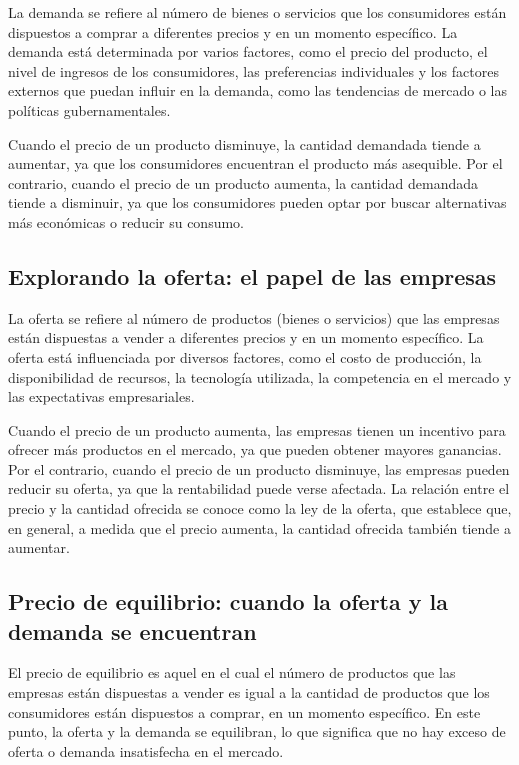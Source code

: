 \documentclass[
  man,
  floatsintext,
  longtable,
  a4paper,
  nolmodern,
  notxfonts,
  notimes,
  12pt,
  colorlinks=true,linkcolor=blue,citecolor=blue,urlcolor=blue]{apa7}
\begin{document}
La demanda se refiere al número de bienes o servicios que los
consumidores están dispuestos a comprar a diferentes precios y en un
momento específico. La demanda está determinada por varios factores,
como el precio del producto, el nivel de ingresos de los consumidores,
las preferencias individuales y los factores externos que puedan influir
en la demanda, como las tendencias de mercado o las políticas
gubernamentales.

Cuando el precio de un producto disminuye, la cantidad demandada tiende
a aumentar, ya que los consumidores encuentran el producto más
asequible. Por el contrario, cuando el precio de un producto aumenta, la
cantidad demandada tiende a disminuir, ya que los consumidores pueden
optar por buscar alternativas más económicas o reducir su consumo.

\subsection{Explorando la oferta: el papel de las
empresas}\label{explorando-la-oferta-el-papel-de-las-empresas}

La oferta se refiere al número de productos (bienes o servicios) que las
empresas están dispuestas a vender a diferentes precios y en un momento
específico. La oferta está influenciada por diversos factores, como el
costo de producción, la disponibilidad de recursos, la tecnología
utilizada, la competencia en el mercado y las expectativas
empresariales.

Cuando el precio de un producto aumenta, las empresas tienen un
incentivo para ofrecer más productos en el mercado, ya que pueden
obtener mayores ganancias. Por el contrario, cuando el precio de un
producto disminuye, las empresas pueden reducir su oferta, ya que la
rentabilidad puede verse afectada. La relación entre el precio y la
cantidad ofrecida se conoce como la ley de la oferta, que establece que,
en general, a medida que el precio aumenta, la cantidad ofrecida también
tiende a aumentar.

\subsection{Precio de equilibrio: cuando la oferta y la demanda se
encuentran}\label{precio-de-equilibrio-cuando-la-oferta-y-la-demanda-se-encuentran}

El precio de equilibrio es aquel en el cual el número de productos que
las empresas están dispuestas a vender es igual a la cantidad de
productos que los consumidores están dispuestos a comprar, en un momento
específico. En este punto, la oferta y la demanda se equilibran, lo que
significa que no hay exceso de oferta o demanda insatisfecha en el
mercado.
\end{document}
